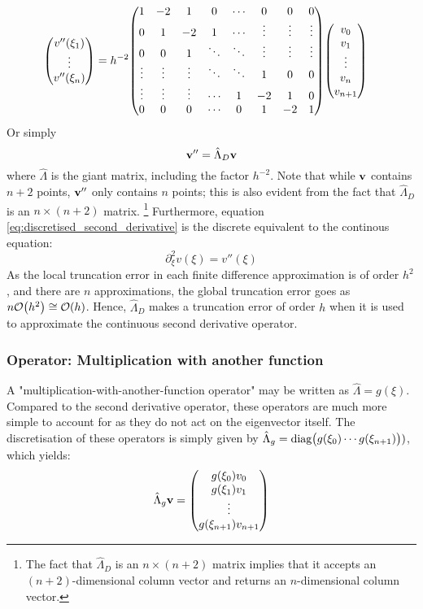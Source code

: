 \documentclass[reprint,english]{revtex4-1}
\begin{document}
\begin{align*}
\mqty(v''(\xi_1)\\\vdots\\v''(\xi_n)) &= h^{-2}
\mqty(1      & -2      & 1       & 0      & \cdots &  0       & 0        & 0      \\
      0      &  1      & -2      & 1      & \cdots &  \vdots  & \vdots   & \vdots \\
      0      &  0      & 1       & \ddots & \ddots &  \vdots  & \vdots   & \vdots \\
      \vdots &  \vdots & \vdots  & \ddots & \ddots &  1       &  0       & 0      \\
      \vdots &  \vdots & \vdots  & \cdots & 1      & -2       &  1       & 0      \\
      0      &  0      & 0       & \cdots & 0      & 1        &  -2      & 1       )
\mqty(v_0\\v_1\\\vdots\\v_n\\v_{n+1})
\end{align*}
Or simply
\begin{equation}\label{eq:discretised_second_derivative}
\vb{v}''=\hat{\Lambda}_D\vb{v}
\end{equation}
where \(\hat{\Lambda}\) is the giant matrix, including the factor \(h^{-2}\). Note that while \(\vb{v}\) contains \(n+2\) points, \(\vb{v}''\) only contains \(n\) points; this is also evident from the fact that \(\hat{\Lambda}_D\) is an \(n\times(n+2)\) matrix. \footnote{The fact that \(\hat{\Lambda}_D\) is an \(n\times(n+2)\) matrix implies that it accepts an \((n+2)\)-dimensional column vector and returns an \(n\)-dimensional column vector.} Furthermore, equation \eqref{eq:discretised_second_derivative} is the discrete equivalent to the continous equation:
\[\partial_\xi^2v(\xi)=v''(\xi)\]
As the local truncation error in each finite difference approximation is of order \(h^2\), and there are \(n\) approximations, the global truncation error goes as \(n\order{h^2}\cong \order{h}\). Hence, \(\hat{\Lambda}_D\) makes a truncation error of order \(h\) when it is used to approximate the continuous second derivative operator.
\subsubsection{Operator: Multiplication with another function}
A "multiplication-with-another-function operator" may be written as \(\hat{\Lambda}=g(\xi)\). Compared to the second derivative operator, these operators are much more simple to account for as they do not act on the eigenvector itself. The discretisation of these operators is simply given by \(\hat{\Lambda}_g=\text{diag}\mqty(g(\xi_0)\cdots g(\xi_{n+1})))\), which yields:
\begin{equation}
\hat{\Lambda}_g\vb{v}=\mqty(g(\xi_0)v_0\\g(\xi_1)v_1\\\vdots\\g(\xi_{n+1})v_{n+1})
\end{equation}
\end{document}
